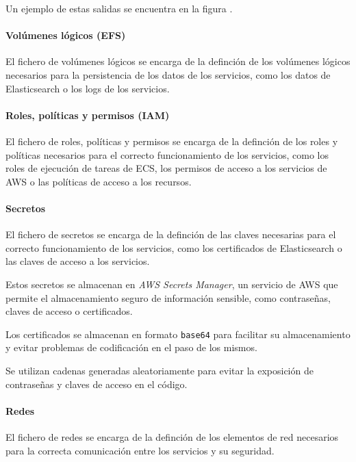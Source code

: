Un ejemplo de estas salidas se encuentra en la figura
.


\newpage{}
\paragraph{Volúmenes lógicos (EFS)}
El fichero de volúmenes lógicos  se encarga de la
definción de los volúmenes lógicos necesarios para la persistencia de los datos
de los servicios, como los datos de Elasticsearch o los logs de los servicios.


\paragraph{Roles, políticas y permisos (IAM)}
El fichero de roles, políticas y permisos  se encarga
de la definción de los roles y políticas necesarios para el correcto
funcionamiento de los servicios, como los roles de ejecución de tareas de ECS,
los permisos de acceso a los servicios de AWS o las políticas de acceso a los
recursos.


\paragraph{Secretos}
El fichero de secretos  se encarga de la
definción de las claves necesarias para el correcto funcionamiento de los
servicios, como los certificados de Elasticsearch o las claves de acceso a los
servicios.

Estos secretos se almacenan en \textit{AWS Secrets Manager}, un servicio de AWS
que permite el almacenamiento seguro de información sensible, como contraseñas,
claves de acceso o certificados.

Los certificados se almacenan en formato \texttt{base64} para facilitar su
almacenamiento y evitar problemas de codificación en el paso de los mismos.

Se utilizan cadenas generadas aleatoriamente para evitar la exposición de
contraseñas y claves de acceso en el código.


\paragraph{Redes}
El fichero de redes  se encarga de la definción
de los elementos de red necesarios para la correcta comunicación entre los
servicios y su seguridad.

